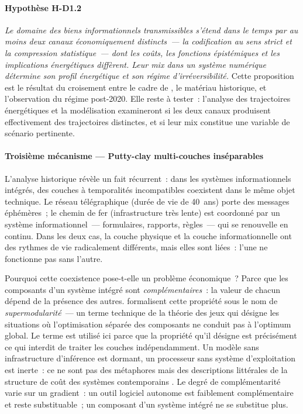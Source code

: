 \paragraph{Hypothèse H-D1.2} \emph{Le domaine des biens informationnels transmissibles s'étend dans le temps par au moins deux canaux économiquement distincts~--- la codification au sens strict et la compression statistique~--- dont les coûts, les fonctions épistémiques et les implications énergétiques diffèrent. Leur mix dans un système numérique détermine son profil énergétique et son régime d'irréversibilité.} Cette proposition est le résultat du croisement entre le cadre de \textcite{cowan_explicit_2000}, le matériau historique, et l'observation du régime post-2020. Elle reste à tester~: l'analyse des trajectoires énergétiques et la modélisation examineront si les deux canaux produisent effectivement des trajectoires distinctes, et si leur mix constitue une variable de scénario pertinente.


\paragraph{Troisième mécanisme --- Putty-clay multi-couches inséparables}

\markNEO \markMARX
L'analyse historique révèle un fait récurrent~: dans les systèmes informationnels intégrés, des couches à temporalités incompatibles coexistent dans le même objet technique. Le réseau télégraphique (durée de vie de 40~ans) porte des messages éphémères~; le chemin de fer (infrastructure très lente) est coordonné par un système informationnel~--- formulaires, rapports, règles~--- qui se renouvelle en continu. Dans les deux cas, la couche physique et la couche informationnelle ont des rythmes de vie radicalement différents, mais elles sont liées~: l'une ne fonctionne pas sans l'autre.

Pourquoi cette coexistence pose-t-elle un problème économique~? Parce que les composants d'un système intégré sont \emph{complémentaires}~: la valeur de chacun dépend de la présence des autres. \textcite{milgrom_economics_1990} formalisent cette propriété sous le nom de \emph{supermodularité}~--- un terme technique de la théorie des jeux qui désigne les situations où l'optimisation séparée des composants ne conduit pas à l'optimum global. Le terme est utilisé ici parce que la propriété qu'il désigne est précisément ce qui interdit de traiter les couches indépendamment. Un modèle sans infrastructure d'inférence est dormant, un processeur sans système d'exploitation est inerte~: ce ne sont pas des métaphores mais des descriptions littérales de la structure de coût des systèmes contemporains \parencite{haskel_capitalism_2018}. Le degré de complémentarité varie sur un gradient~: un outil logiciel autonome est faiblement complémentaire et reste substituable~; un composant d'un système intégré ne se substitue plus.

